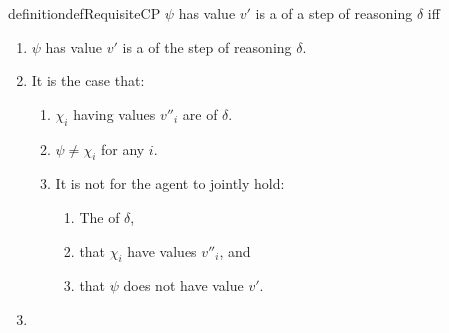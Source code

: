 \begin{note}
  \begin{restatable}{definition}{defRequisiteCP}
    \label{def:cprequ}
    \(\psi\) has value \(v'\) is a \emph{} of a step of reasoning \(\delta\) iff
    \begin{enumerate}[label=\arabic*., ref=\named{cpR:\arabic*}]
    \item
      \label{def:cprequ:result}
      \(\psi\) has value \(v'\) is a  of the step of reasoning \(\delta\).
    \item It is the case that:
      \label{def:cprequ:subjunctive}
      \begin{enumerate}[label=\alph*., ref=\named{cpR:2\alph*}]
      \item
        \label{def:cprequ:subjunctive:chi}
        \(\chi_{i}\) having values \(v''_{i}\) are  of \(\delta\).
      \item
        \label{def:cprequ:subjunctive:unique}
        \(\psi \ne \chi_{i}\) for any \(i\).
      \item
        \label{def:cprequ:subjunctive:relation}
        It is not \epVAd{} for the agent to jointly hold:
          \begin{enumerate}
          \item
            The  of \(\delta\),
          \item
            that \(\chi_{i}\) have values \(v''_{i}\), and
          \item
            that \(\psi\) does not have value \(v'\).
          \end{enumerate}
      \end{enumerate}
    \item
      \requGlobalClause{}
    \end{enumerate}
    \vspace{-\baselineskip}
  \end{restatable}
\end{note}

